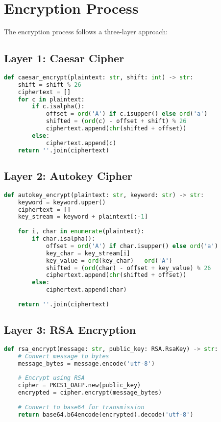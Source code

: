\documentclass[12pt,a4paper]{article}
\begin{document}
\section{Encryption Process}
The encryption process follows a three-layer approach:

\subsection{Layer 1: Caesar Cipher}
\begin{lstlisting}[language=Python]
def caesar_encrypt(plaintext: str, shift: int) -> str:
    shift = shift % 26
    ciphertext = []
    for c in plaintext:
        if c.isalpha():
            offset = ord('A') if c.isupper() else ord('a')
            shifted = (ord(c) - offset + shift) % 26
            ciphertext.append(chr(shifted + offset))
        else:
            ciphertext.append(c)
    return ''.join(ciphertext)
\end{lstlisting}

\subsection{Layer 2: Autokey Cipher}
\begin{lstlisting}[language=Python]
def autokey_encrypt(plaintext: str, keyword: str) -> str:
    keyword = keyword.upper()
    ciphertext = []
    key_stream = keyword + plaintext[:-1]
    
    for i, char in enumerate(plaintext):
        if char.isalpha():
            offset = ord('A') if char.isupper() else ord('a')
            key_char = key_stream[i]
            key_value = ord(key_char) - ord('A')
            shifted = (ord(char) - offset + key_value) % 26
            ciphertext.append(chr(shifted + offset))
        else:
            ciphertext.append(char)
    
    return ''.join(ciphertext)
\end{lstlisting}

\subsection{Layer 3: RSA Encryption}
\begin{lstlisting}[language=Python]
def rsa_encrypt(message: str, public_key: RSA.RsaKey) -> str:
    # Convert message to bytes
    message_bytes = message.encode('utf-8')
    
    # Encrypt using RSA
    cipher = PKCS1_OAEP.new(public_key)
    encrypted = cipher.encrypt(message_bytes)
    
    # Convert to base64 for transmission
    return base64.b64encode(encrypted).decode('utf-8')
\end{lstlisting}
\end{document}
